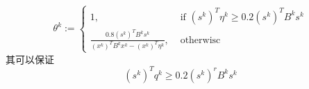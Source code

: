 \documentclass{article}
\begin{document}
\begin{equation}\theta^{k}:=\left\{\begin{array}{ll}
1, & \text { if }\left(s^{k}\right)^{T} \eta^{k} \geq 0.2\left(s^{k}\right)^{T} B^{k} s^{k} \\
\frac{0.8\left(s^{k}\right)^{T} B^{k}s^{k}}{\left(x^{k}\right)^{T} B^{k}x^{k}-\left(x^{k}\right)^{T} \eta^{k}}, & \text { otherwisc }
\end{array}\right.
\end{equation}
其可以保证
\begin{equation}
\left(s^{k}\right)^{T} q^{k} \geq 0.2\left(s^{k}\right)^{r} B^{k} s^{k}
\end{equation}
\end{document}
